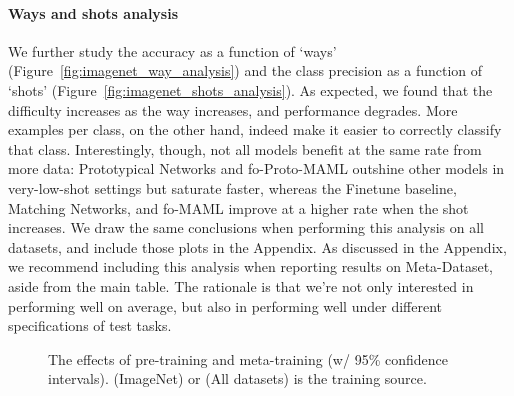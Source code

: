 \documentclass{article} \usepackage{iclr2020_conference,times}
\begin{document}
\paragraph{Ways and shots analysis} We further study the accuracy as a function of `ways' (Figure~\ref{fig:imagenet_way_analysis})
and the class precision as a function of `shots' (Figure~\ref{fig:imagenet_shots_analysis}). As expected, we found that the difficulty increases as the way increases, and performance degrades. More examples per class, on the other hand, indeed make it easier to correctly classify that class. Interestingly, though, not all models benefit at the same rate from more data: Prototypical Networks and
fo-Proto-MAML outshine other models in very-low-shot settings but saturate faster, whereas the Finetune baseline, Matching Networks, and fo-MAML improve at a higher rate when the shot increases. We draw the same conclusions when performing this analysis on all datasets, and include those plots in the Appendix. As discussed in the Appendix, we recommend including this analysis when reporting results on Meta-Dataset, aside from the main table. The rationale is that we're not only interested in performing well on average, but also in performing well under different specifications of test tasks.


\begin{figure*}[h]
  \centering
	\hspace{0.001cm}
	\hspace{0.001cm}
	\hspace{0.001cm}
	\hspace{0.001cm}
	\caption{The effects of pre-training and meta-training (w/ 95\% confidence intervals). (ImageNet) or (All datasets) is the training source.}
\end{figure*}
\end{document}
